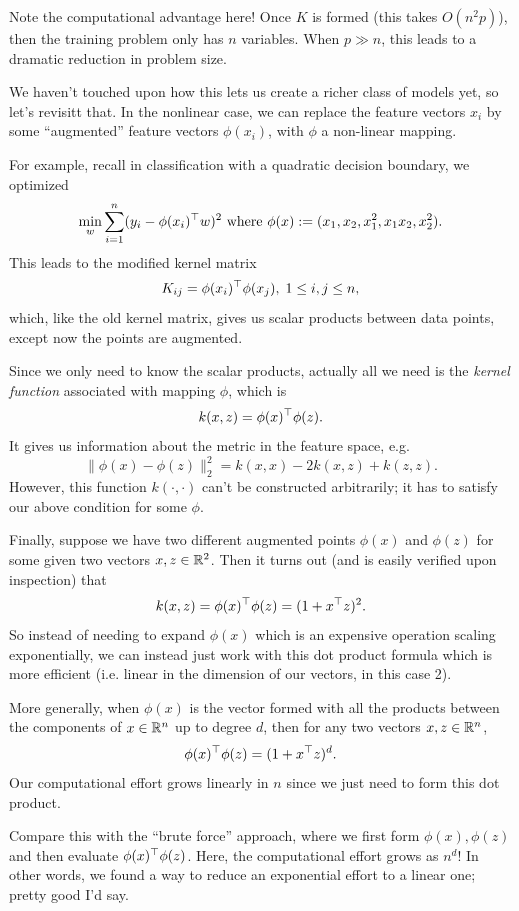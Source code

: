 \documentclass[11 pt]{scrartcl}
\begin{document}
Note the computational advantage here! 
Once $K$ is formed (this takes $O(n^2p)$), then the training problem only has $n$ variables. 
When $p \gg n$, this leads to a dramatic reduction in problem size.

We haven't touched upon how this lets us create a richer class of models yet, so let's revisitt that. 
In the nonlinear case, we can replace the feature vectors $x_i$ by some ``augmented'' feature vectors $\phi(x_i)$, with $\phi$ a non-linear mapping. 

For example, recall in classification with a quadratic decision boundary, we optimized 
\[ \min_w \sum_{i=1}^n (y_i - \phi(x_i)^\top w)^2 \text{  where  } \phi(x) := (x_1, x_2, x_1^2, x_1x_2, x_2^2). \]
This leads to the modified kernel matrix 
\[ K_{ij} = \phi(x_i)^\top \phi(x_j), \; 1\leq i,j\leq n,\]
which, like the old kernel matrix, gives us scalar products between data points, except now the points are augmented. 

Since we only need to know the scalar products, actually all we need is the \emph{kernel function} associated with mapping $\phi$, which is 
\[ k(x,z) = \phi(x)^\top \phi(z).\] 
It gives us information about the metric in the feature space, e.g. 
\[ \| \phi(x) - \phi(z) \|^2_2 = k(x,x) - 2k(x,z) + k(z,z).\] 
However, this function $k(\cdot, \cdot)$ can't be constructed arbitrarily; it has to satisfy our above condition for some $\phi$. 

Finally, suppose we have two different augmented points $\phi(x)$ and $\phi(z)$ for some given two vectors $x,z\in\mathbb R^2$.
Then it turns out (and is easily verified upon inspection) that  
\[ k(x,z) = \phi(x)^\top \phi(z) = (1 + x^\top z)^2.\] 
So instead of needing to expand $\phi(x)$ which is an expensive operation scaling exponentially, we can instead just work with this dot product formula which is more efficient (i.e. linear in the dimension of our vectors, in this case 2).  

More generally, when $\phi(x)$ is the vector formed with all the products between the components of $x\in \mathbb R^n$ up to degree $d$, then for any two vectors $x,z\in \mathbb R^n$, 
\[ \phi(x)^\top \phi(z) = (1+x^\top z)^d.\] 
Our computational effort grows linearly in $n$ since we just need to form this dot product. 

Compare this with the ``brute force'' approach, where we first form $\phi(x),\phi(z)$ and then evaluate $\phi(x)^\top \phi(z)$. 
Here, the computational effort grows as $n^d$! 
In other words, we found a way to reduce an exponential effort to a linear one; pretty good I'd say. 
\end{document}
